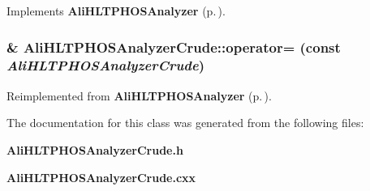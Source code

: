 Implements {\bf Ali\-HLTPHOSAnalyzer} {\rm (p.\,\pageref{classAliHLTPHOSAnalyzer_a14})}.
\subsubsection{\& Ali\-HLTPHOSAnalyzer\-Crude::operator= (const  {\em Ali\-HLTPHOSAnalyzer\-Crude})\hspace{0.3cm}{\tt  [inline]}}\label{classAliHLTPHOSAnalyzerCrude_a2}




Reimplemented from {\bf Ali\-HLTPHOSAnalyzer} {\rm (p.\,\pageref{classAliHLTPHOSAnalyzer_a4})}.

The documentation for this class was generated from the following files:\begin{CompactItemize}
\item 
{\bf Ali\-HLTPHOSAnalyzer\-Crude.h}\item 
{\bf Ali\-HLTPHOSAnalyzer\-Crude.cxx}\end{CompactItemize}
